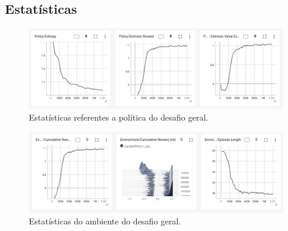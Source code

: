 \subsection*{Estatísticas}
\begin{figure}[h]
    \centering
    \includegraphics[scale=0.35]{figs/treinos/desafio-geral/politica.png}
    \caption{Estatísticas referentes a política do desafio geral.}
\end{figure}

\begin{figure}[h]
    \centering
    \includegraphics[scale=0.35]{figs/treinos/desafio-geral/ambiente.png}
    \caption{Estatísticas do ambiente do desafio geral.}
\end{figure}

